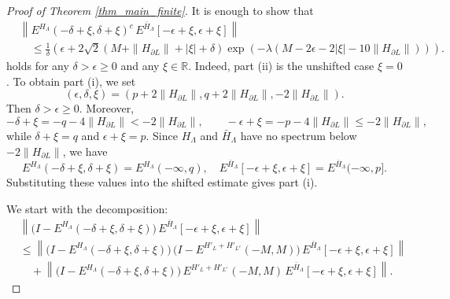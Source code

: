 \documentclass[11pt]{article}
\numberwithin{equation}{section}
\begin{document}
\medskip
\begin{proof}[Proof of Theorem \ref{thm_main_finite}]
It is enough to show that
\begin{align*}
&\left\|E^{H_\Lambda}(-\delta+\xi,\delta+\xi)^c\, E^{\bar{H}_\Lambda}[-\epsilon+\xi,\epsilon+\xi]\right\|\\
&\quad\leq\frac{1}{\delta} \left(\epsilon+2\sqrt{2}(M+\|H_{\partial L}\|+|\xi|+\delta) \exp(-\lambda(M-2\epsilon-2|\xi|-10\|H_{\partial L}\|))\right).
\end{align*}
holds for any $\delta>\epsilon\geq0$ and any $\xi\in\mathbb{R}$. Indeed, part (ii) is the unshifted case $\xi=0$. To obtain part (i), we set
\[
(\epsilon,\delta,\xi)=(p+2\|H_{\partial L}\|,q+2\|H_{\partial L}\|,-2\|H_{\partial L}\|).
\]
Then $\delta>\epsilon\geq0$. Moreover,
\[
-\delta+\xi=-q-4\|H_{\partial L}\|<-2\|H_{\partial L}\|,\qquad
-\epsilon+\xi=-p-4\|H_{\partial L}\|\leq -2\|H_{\partial L}\|,
\]
while $\delta+\xi=q$ and $\epsilon+\xi=p$.  Since $H_\Lambda$ and $\bar{H}_\Lambda$ have no spectrum below $-2\|H_{\partial L}\|$, we have
\[
E^{H_\Lambda}(-\delta+\xi,\delta+\xi)
=E^{H_\Lambda}(-\infty,q),\quad E^{\bar{H}_\Lambda}[-\epsilon+\xi,\epsilon+\xi]
=E^{\bar{H}_\Lambda}(-\infty,p].
\]
Substituting these values into the shifted estimate gives part (i).

We start with the decomposition:
\begin{align*}
&\left\|\Big(I-E^{H_\Lambda}(-\delta+\xi,\delta+\xi)\Big)\, E^{\bar{H}_\Lambda}[-\epsilon+\xi,\epsilon+\xi]\right\|\\
&\leq\left\|\Big(I-E^{H_\Lambda}(-\delta+\xi,\delta+\xi)\Big)\, \Big(I-E^{H'_L+H'_{L^c}}(-M,M)\Big)\,
E^{\bar{H}_\Lambda}[-\epsilon+\xi,\epsilon+\xi]\right\|\\
&\quad+\left\|\Big(I-E^{H_\Lambda}(-\delta+\xi,\delta+\xi)\Big)\, E^{H'_L+H'_{L^c}}(-M,M)\, E^{\bar{H}_\Lambda}[-\epsilon+\xi,\epsilon+\xi]\right\|.
\end{align*}


\end{proof}
\end{document}
